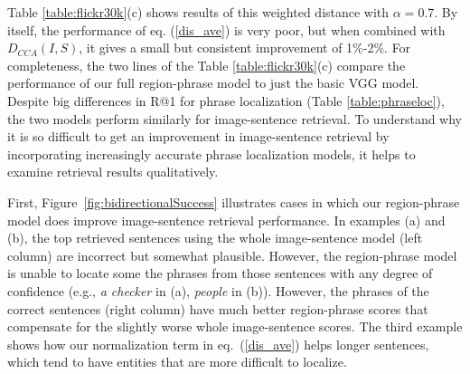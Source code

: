 \documentclass[twocolumn]{svjour3}
\begin{document}
Table \ref{table:flickr30k}(c) shows results of this weighted distance with $\alpha = 0.7$. By itself, the performance of eq. (\ref{dis_ave}) is very poor, but when combined with $D_{CCA}(I,S)$, it gives a small but consistent improvement of 1\%-2\%. For completeness, the two lines of the Table \ref{table:flickr30k}(c) compare the performance of our full region-phrase model to just the basic VGG model. Despite big differences in R@1 for phrase localization (Table \ref{table:phraseloc}), the two models perform similarly for image-sentence retrieval. To understand why it is so difficult to get an improvement in image-sentence retrieval by incorporating increasingly accurate phrase localization models, it helps to examine retrieval results qualitatively. 

First, Figure~\ref{fig:bidirectionalSuccess} illustrates cases in which our region-phrase model does improve image-sentence retrieval performance.  In examples (a) and (b), the top retrieved sentences using the whole image-sentence model (left column) are incorrect but somewhat plausible.  However, the region-phrase model is unable to locate some the phrases from those sentences with any degree of confidence (e.g., {\em a checker} in (a), {\em people} in (b)).  However, the phrases of the correct sentences (right column) have much better region-phrase scores that compensate for the slightly worse whole image-sentence scores. The third example shows how our normalization term in eq.~(\ref{dis_ave}) helps longer sentences, which tend to have entities that are more difficult to localize.
\end{document}
